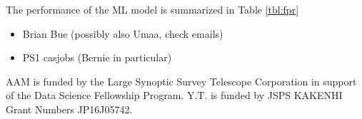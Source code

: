 \documentclass[twocolumn]{aastex62}
\begin{document}
The performance of the ML model is summarized in Table \ref{tbl:fpr}

\acknowledgements

\begin{itemize}
    \item Brian Bue (possibly also Umaa, check emails)
    \item PS1 casjobs (Bernie in particular)
\end{itemize}

AAM is funded by the Large Synoptic Survey Telescope Corporation in support of
the Data Science Fellowship Program. 
Y.T. is funded by JSPS KAKENHI Grant Numbers JP16J05742. 




\appendix




\end{document}
